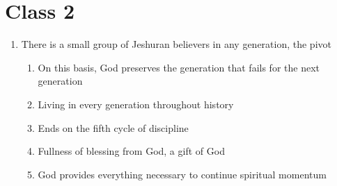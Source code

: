 \documentclass[11pt]{article}
\begin{document}
\section{Class 2}
\begin{enumerate}
	\item There is a small group of Jeshuran believers in any generation, the pivot
	\begin{enumerate}
		\item On this basis, God preserves the generation that fails for the next generation
		\item Living in every generation throughout history
		\item Ends on the fifth cycle of discipline
		\item Fullness of blessing from God, a gift of God
		\item God provides everything necessary to continue spiritual momentum
		

\end{enumerate}
\end{enumerate}
\end{document}
